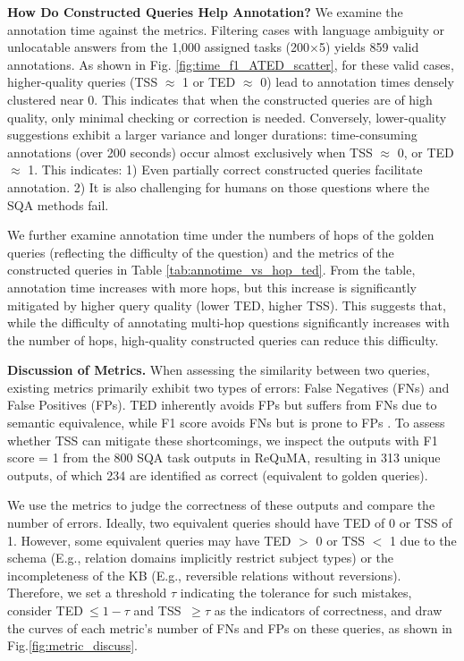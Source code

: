 \documentclass[runningheads]{llncs}
\begin{document}
\noindent \textbf{How Do Constructed Queries Help Annotation?}
We examine the annotation time against the metrics. 
Filtering cases with language ambiguity or unlocatable answers from the 1,000 assigned tasks (200$\times$5) yields 859 valid annotations.
As shown in Fig. \ref{fig:time_f1_ATED_scatter}, for these valid cases, higher-quality queries (TSS $\approx$ 1 or TED $\approx$ 0) lead to annotation times densely clustered near 0.
This indicates that when the constructed queries are of high quality, only minimal checking or correction is needed.
Conversely, lower-quality suggestions exhibit a larger variance and longer durations: time-consuming annotations (over 200 seconds) occur almost exclusively when TSS $\approx$ 0, or TED $\approx$ 1.
This indicates: 1) Even partially correct constructed queries facilitate annotation. 2) It is also challenging for humans on those questions where the SQA methods fail.

We further examine annotation time under the numbers of hops of the golden queries (reflecting the difficulty of the question) and the metrics of the constructed queries in Table \ref{tab:annotime_vs_hop_ted}. From the table, annotation time increases with more hops, but this increase is significantly mitigated by higher query quality (lower TED, higher TSS). This suggests that, while the difficulty of annotating multi-hop questions significantly increases with the number of hops, high-quality constructed queries can reduce this difficulty.

\noindent \textbf{Discussion of Metrics.}
When assessing the similarity between two queries, existing metrics primarily exhibit two types of errors: False Negatives (FNs) and False Positives (FPs). 
TED inherently avoids FPs but suffers from FNs due to semantic equivalence, while F1 score avoids FNs but is prone to FPs \cite{zhong2020semanticsql}.
To assess whether TSS can mitigate these shortcomings, we inspect the outputs with F1 score = 1 from the 800 SQA task outputs in ReQuMA, resulting in 313 unique outputs, of which 234 are identified as correct (equivalent to golden queries). 



We use the metrics to judge the correctness of these outputs and compare the number of errors.
Ideally, two equivalent queries should have TED of 0 or TSS of 1. However, some equivalent queries may have TED $>$ 0 or TSS $<$ 1 due to the schema (E.g., relation domains implicitly restrict subject types) or the incompleteness of the KB (E.g., reversible relations without reversions).
Therefore, we set a threshold $\tau$ indicating the tolerance for such mistakes, consider TED$\ \le 1- \tau$ and TSS $\ \ge \tau$ as the indicators of correctness, and draw the curves of each metric's number of FNs and FPs on these queries, as shown in Fig.\ref{fig:metric_discuss}. 
\end{document}
